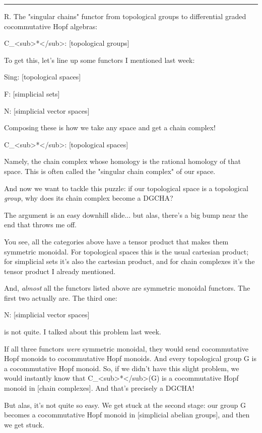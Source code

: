 \par\noindent\rule{\textwidth}{0.4pt}
R.  The "singular chains" functor from topological groups to
differential graded cocommutative Hopf algebras:

C_{<sub>*}</sub>: [topological groups] \to  [DGCHAs]

To get this, let's line up some functors I mentioned last week:

Sing: [topological spaces] 

F: [simplicial sets] 

N: [simplicial vector spaces] 

Composing these is how we take any space and get a chain complex!

C_{<sub>*}</sub>: [topological spaces] 

Namely, the chain complex whose homology is the rational homology 
of that space.   This is often called the "singular chain complex"
of our space.

And now we want to tackle this puzzle: if our topological space is a
topological \emph{group}, why does its chain complex become a DGCHA?

The argument is an easy downhill slide... but alas, there's a big bump
near the end that throws me off.

You see, all the categories above have a tensor product that makes
them symmetric monoidal.  For topological spaces this is the usual
cartesian product; for simplicial sets it's also the cartesian
product, and for chain complexes it's the tensor product I already
mentioned.

And, \emph{almost} all the functors listed above are symmetric monoidal
functors.  The first two actually are.  The third one:

N: [simplicial vector spaces] 

is not quite.  I talked about this problem last week.  

If all three functors \emph{were} symmetric monoidal, they would
send cocommutative Hopf monoids to cocommutative Hopf monoids.  And
every topological group G is a cocommutative Hopf monoid.  So, if we
didn't have this slight problem, we would instantly know that
C_{<sub>*}</sub>(G) is a cocommutative Hopf monoid in [chain
complexes].  And that's precisely a DGCHA!

But alas, it's not quite so easy.  We get stuck at the second stage:
our group G becomes a cocommutative Hopf monoid in [simplicial
abelian groups], and then we get stuck.  


